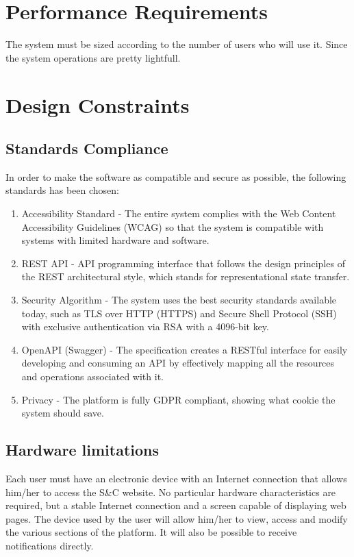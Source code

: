 \section{Performance Requirements}
The system must be sized according to the number of users who will use it. Since the system operations are pretty lightfull.

\section{Design Constraints}
\subsection{Standards Compliance}
In order to make the software as compatible and secure as possible, the following standards has been chosen: 
\begin{enumerate}
    \item Accessibility Standard - The entire system complies with the Web Content Accessibility Guidelines (WCAG) so that the system is compatible with systems with limited hardware and software.
    \item REST API - API programming interface that follows the design principles of the REST architectural style, which stands for representational state transfer.
    \item Security Algorithm - The system uses the best security standards available today, such as TLS over HTTP (HTTPS) and Secure Shell Protocol (SSH) with exclusive authentication via RSA with a 4096-bit key.
    \item OpenAPI (Swagger) -  The specification creates a RESTful interface for easily developing and consuming an API by effectively mapping all the resources and operations associated with it.
    \item Privacy - The platform is fully GDPR compliant, showing what cookie the system should save.
\end{enumerate}


\subsection{Hardware limitations}
Each user must have an electronic device with an Internet connection that allows him/her to access the S\&C website. No particular hardware characteristics are required, but a stable Internet connection and a screen capable of displaying web pages. The device used by the user will allow him/her to view, access and modify the various sections of the platform. It will also be possible to receive notifications directly.
